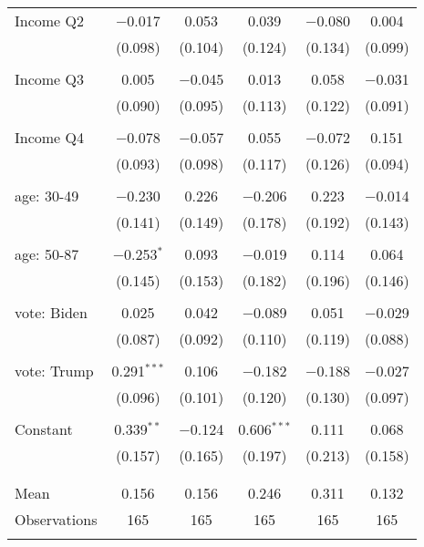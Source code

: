 \begin{tabular}{@{\extracolsep{5pt}}lccccc}
 Income Q2 & $-$0.017 & 0.053 & 0.039 & $-$0.080 & 0.004 \\ 
  & (0.098) & (0.104) & (0.124) & (0.134) & (0.099) \\ 
  & & & & & \\ 
 Income Q3 & 0.005 & $-$0.045 & 0.013 & 0.058 & $-$0.031 \\ 
  & (0.090) & (0.095) & (0.113) & (0.122) & (0.091) \\ 
  & & & & & \\ 
 Income Q4 & $-$0.078 & $-$0.057 & 0.055 & $-$0.072 & 0.151 \\ 
  & (0.093) & (0.098) & (0.117) & (0.126) & (0.094) \\ 
  & & & & & \\ 
 age: 30-49 & $-$0.230 & 0.226 & $-$0.206 & 0.223 & $-$0.014 \\ 
  & (0.141) & (0.149) & (0.178) & (0.192) & (0.143) \\ 
  & & & & & \\ 
 age: 50-87 & $-$0.253$^{*}$ & 0.093 & $-$0.019 & 0.114 & 0.064 \\ 
  & (0.145) & (0.153) & (0.182) & (0.196) & (0.146) \\ 
  & & & & & \\ 
 vote: Biden & 0.025 & 0.042 & $-$0.089 & 0.051 & $-$0.029 \\ 
  & (0.087) & (0.092) & (0.110) & (0.119) & (0.088) \\ 
  & & & & & \\ 
 vote: Trump & 0.291$^{***}$ & 0.106 & $-$0.182 & $-$0.188 & $-$0.027 \\ 
  & (0.096) & (0.101) & (0.120) & (0.130) & (0.097) \\ 
  & & & & & \\ 
 Constant & 0.339$^{**}$ & $-$0.124 & 0.606$^{***}$ & 0.111 & 0.068 \\ 
  & (0.157) & (0.165) & (0.197) & (0.213) & (0.158) \\ 
  & & & & & \\ 
\hline \\[-1.8ex] 
Mean & 0.156 & 0.156 & 0.246 & 0.311 & 0.132 \\ 
Observations & 165 & 165 & 165 & 165 & 165 \\ 
\hline 
\hline \\[-1.8ex] 
\end{tabular} 
